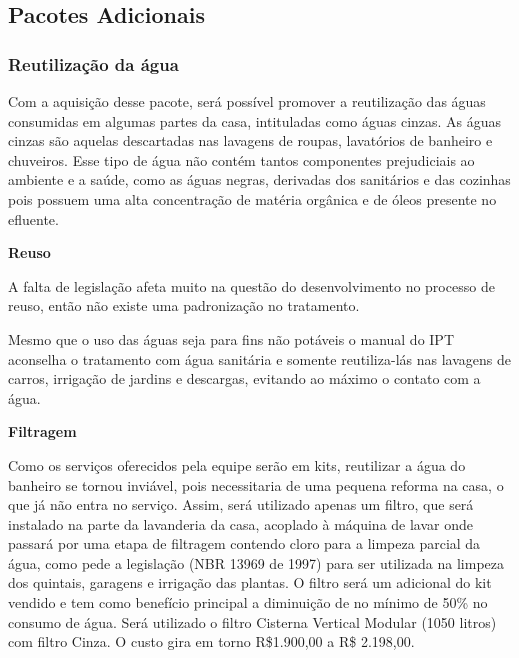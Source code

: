 \subsection{Pacotes Adicionais}

\subsubsection{Reutilização da água}
\par Com a aquisição desse pacote, será possível promover a reutilização das águas consumidas em algumas partes da casa, intituladas como  águas cinzas. As águas cinzas são aquelas descartadas nas lavagens de roupas, lavatórios de banheiro e chuveiros. Esse tipo de água não contém tantos componentes prejudiciais ao ambiente e a saúde, como as águas negras, derivadas dos sanitários e das cozinhas pois possuem uma alta concentração de matéria orgânica e de óleos presente no efluente.

\textbf{Reuso}
\par A falta de legislação afeta muito na questão do desenvolvimento no processo de reuso, então não existe uma padronização no tratamento.
\par Mesmo que o uso das águas seja para fins não potáveis o manual do IPT aconselha o tratamento com água sanitária e somente reutiliza-lás nas lavagens de carros, irrigação de jardins e descargas, evitando ao máximo o contato com a água.

\textbf{Filtragem}
\par Como os serviços oferecidos pela equipe serão em kits, reutilizar a água do banheiro se tornou inviável, pois necessitaria de uma pequena reforma na casa, o que já não entra no serviço. Assim, será utilizado apenas um filtro, que será instalado na parte da lavanderia da casa, acoplado à máquina de lavar onde passará por uma etapa de filtragem contendo cloro para a limpeza parcial da água, como pede a legislação (NBR 13969 de 1997) para ser utilizada na limpeza dos quintais, garagens e irrigação das plantas. O filtro será um adicional do kit vendido e tem como benefício principal a diminuição de no mínimo de 50\% no consumo de água. Será utilizado o filtro Cisterna Vertical Modular (1050 litros) com filtro Cinza.  O custo gira em torno R\$1.900,00 a R\$ 2.198,00.

